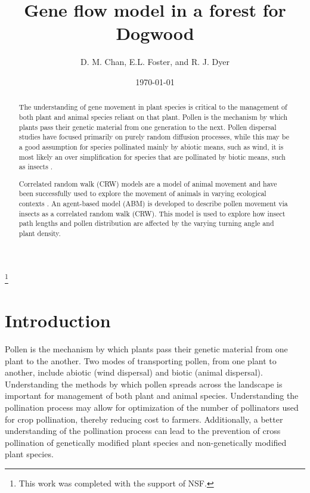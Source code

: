 \documentclass[preprint,12pt]{elsarticle}
\numberwithin{equation}{subsection}
\begin{document}
\title{Gene flow model in a forest for Dogwood}


\author{ D. M. Chan, E.L. Foster, and R. J. Dyer }

\address{Department of Mathematics and Applied Mathematics,
1015 Floyd Ave., Richmond, VA 23284}


\thanks{This work was completed with the support of NSF.}



\date{\today}




\begin{abstract}
The understanding of gene movement in plant species is critical to the
management of both plant and animal species reliant on that plant.
Pollen is the mechanism by which plants pass their genetic material from one
generation to the next. Pollen dispersal studies have focused
primarily on purely random diffusion processes, while this may be a good
assumption for species pollinated mainly by abiotic means, such as
wind, it is most likely an over simplification for species that are pollinated
by biotic means, such as insects \cite{Chan}.

Correlated random walk (CRW) models are a model of animal movement
\cite{Prasad05} and have been successfully used to explore the movement of
animals in varying ecological contexts \cite{Bartumeus07}. An agent-based model
(ABM) is developed to describe pollen movement via insects as
a correlated random walk (CRW). This model is used to explore how insect path
lengths and pollen distribution are affected by the varying
turning angle and plant density.

\end{abstract}

\maketitle

\section{{\bf Introduction}}
Pollen is the mechanism by which plants pass their genetic material from one
plant to the another. Two modes of transporting pollen, from one plant to
another, include abiotic (wind dispersal) and biotic (animal dispersal).
Understanding the methods by which pollen spreads across the landscape is
important for management of both plant and animal species. Understanding the
pollination process may allow for optimization of the number of pollinators used
for crop pollination, thereby reducing cost to farmers. Additionally, a better
understanding of the pollination process can lead to the prevention of cross
pollination of genetically modified plant species and non-genetically modified
plant species.
\end{document}
